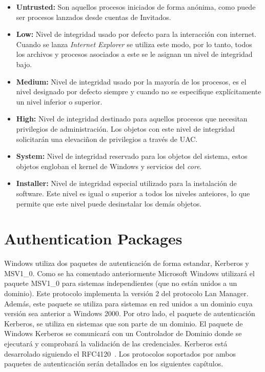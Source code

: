 \begin{itemize}
\item \textbf{Untrusted:} Son aquellos procesos iniciados de forma anónima, como puede ser procesos lanzados desde cuentas de Invitados.  
\item \textbf{Low:} Nivel de integridad usado por defecto para la interacción con internet. Cuando se lanza {\it Internet Explorer} se utiliza este modo, por lo tanto, todos los archivos y procesos asociados a este se le asignan un nivel de integridad bajo.
\item \textbf{Medium:} Nivel de integridad usado por la mayoría de los procesos, es el nivel designado por defecto siempre y cuando no se especifique explícitamente un nivel inferior o superior.
\item \textbf{High:} Nivel de integridad destinado para aquellos procesos que necesitan privilegios de administración. Los objetos con este nivel de integridad solicitarán una elevaciñon de privilegios a través de UAC.
\item \textbf{System:} Nivel de integridad reservado para los objetos del sistema, estos objetos engloban el kernel de Windows y servicios del {\it core}.
\item \textbf{Installer:} Nivel de integridad especial utilizado para la instalación de software. Este nivel es igual o superior a todos los niveles anteiores, lo que permite que este nivel puede desinstalar los demás objetos. 
\end{itemize}

\section{Authentication Packages}

Windows utiliza dos paquetes de autenticación de forma estandar, Kerberos y MSV1\_0. Como se ha comentado anteriormente Microsoft Windows utilizará el paquete MSV1\_0 para sistemas independientes (que no están unidos a un dominio). Este protocolo implementa la versión 2 del protocolo Lan Manager. Además, este paquete se utiliza para sistemas en red unidos a un dominio cuya versión sea anterior a Windows 2000. Por otro lado, el paquete de autenticación Kerberos, se utiliza en sistemas que son parte de un dominio. El paquete de Windows Kerberos se comunicará con un Controlador de Dominio donde se ejecutará y comprobará la validación de las credenciales. Kerberos está desarrolado siguiendo el RFC4120~\cite{Capitulo2:Kerberos}. Los protocolos soportados por ambos paquetes de autenticación serán detallados en los siguientes capítulos.


